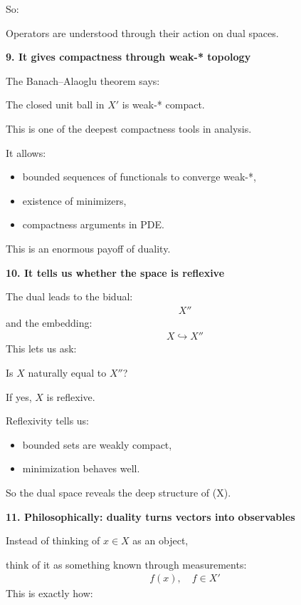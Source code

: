 \documentclass[12pt,a4paper]{report}
\begin{document}
\begin{description}
So:

\> Operators are understood through their action on dual spaces.

\item \textbf{9. It gives compactness through weak-* topology}

The Banach–Alaoglu theorem says:

\> The closed unit ball in $X'$ is weak-* compact.

This is one of the deepest compactness tools in analysis.

It allows:

	\begin{itemize}
    \item bounded sequences of functionals to converge weak-*,
    \item existence of minimizers,
    \item compactness arguments in PDE.
	\end{itemize}

This is an enormous payoff of duality.

\item \textbf{10. It tells us whether the space is reflexive}

The dual leads to the bidual:
\begin{align*}
X''
\end{align*}
and the embedding:
\begin{align*}
X\hookrightarrow X''
\end{align*}
This lets us ask:

\> Is $X$ naturally equal to $X''$?

If yes, $X$ is reflexive.

Reflexivity tells us:

	\begin{itemize}
    \item bounded sets are weakly compact,
    \item minimization behaves well.
	\end{itemize}

So the dual space reveals the deep structure of (X).

\item \textbf{11. Philosophically: duality turns vectors into observables}

Instead of thinking of $x\in X$ as an object,

think of it as something known through measurements:
\begin{align*}
f(x),\quad f\in X'
\end{align*}
This is exactly how:


\end{description}
\end{document}
